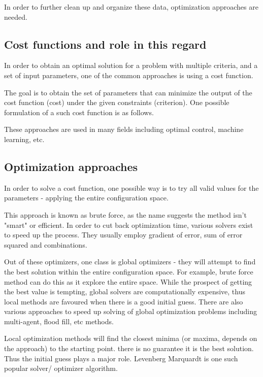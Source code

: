 \documentclass[english, printversion, nomenclature, notitle]{tuvisionthesis} %
\begin{document}
In order to further clean up and organize these data, optimization approaches are needed.

\subsection{Cost functions and role in this regard}

In order to obtain an optimal solution for a problem with multiple criteria, and a set of input parameters, one of the common approaches is using a cost function.

The goal is to obtain the set of parameters that can minimize the output of the cost function (cost) under the given constraints (criterion). One possible formulation of a such cost function is as follows.


These approaches are used in many fields including optimal control, machine learning, etc.

\subsection{Optimization approaches}

In order to solve a cost function, one possible way is to try all valid values for the parameters - applying the entire configuration space.

This approach is known as brute force, as the name suggests the method isn't "smart" or efficient. In order to cut back optimization time, various solvers exist to speed up the process. They usually employ gradient of error, sum of error squared and combinations.

Out of these optimizers, one class is global optimizers - they will attempt to find the best solution within the entire configuration space. For example, brute force method can do this as it explore the entire space. While the prospect of getting the best value is tempting, global solvers are computationally expensive, thus local methods are favoured when there is a good initial guess. There are also various approaches to speed up solving of global optimization problems including multi-agent, flood fill, etc methods. 

Local optimization methods will find the closest minima (or maxima, depends on the approach) to the starting point. there is no guarantee it is the best solution. Thus the initial guess plays a major role. Levenberg Marquardt is one such popular solver/ optimizer algorithm.
\end{document}
